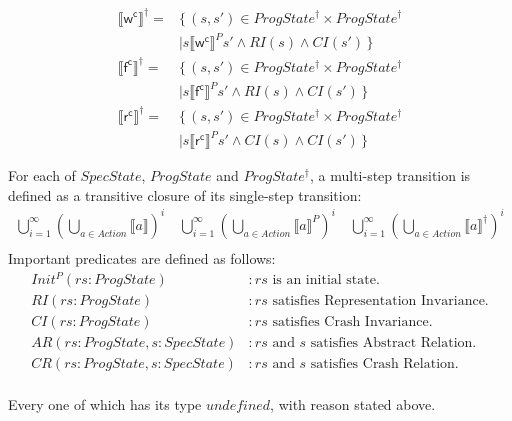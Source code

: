 \documentclass[a4paper,11pt]{article}
\theoremstyle{definition}
\begin{document}
\begin{align*}
	\llbracket \mathsf {w^c} \rrbracket^\dagger ={}& \{\, (s, s') \in ProgState^\dagger \times ProgState^\dagger\\ &\mid s \llbracket \mathsf {w^c} \rrbracket^P s' \land \mathit{RI(s)} \land \mathit{CI(s')} \,\} \\
	\llbracket \mathsf {f^c} \rrbracket^\dagger ={}& \{\, (s, s') \in ProgState^\dagger \times ProgState^\dagger\\ &\mid s \llbracket \mathsf {f^c} \rrbracket^P s' \land \mathit{RI(s)} \land \mathit{CI(s')} \,\} \\
	\llbracket \mathsf {r^c} \rrbracket^\dagger ={}& \{\, (s, s') \in ProgState^\dagger \times ProgState^\dagger\\ &\mid s \llbracket \mathsf {r^c} \rrbracket^P s' \land \mathit{CI(s)} \land \mathit{CI(s')} \,\} 
\end{align*}

For each of $\mathit{SpecState}$, $\mathit{ProgState}$ and $\mathit{ProgState^\dagger}$, a multi-step transition is defined as a transitive closure of its single-step transition:
\begin{align*}
	\bigcup_{i=1}^\infty\left(\bigcup_{a \in Action} \llbracket a \rrbracket \right)^i \quad
	\bigcup_{i=1}^\infty\left(\bigcup_{a \in Action} \llbracket a \rrbracket^P \right)^i \quad
	\bigcup_{i=1}^\infty\left(\bigcup_{a \in Action} \llbracket a \rrbracket^\dagger \right)^i \\
\end{align*}
Important predicates are defined as follows:
\begin{align*}
	\mathit{Init^P(rs : ProgState)} &: \text{$\mathit{rs}$ is an initial state.}\\
	\mathit{RI(rs : ProgState)} &: \text{$\mathit{rs}$ satisfies Representation Invariance.} \\
	\mathit{CI(rs : ProgState)} &: \text{$\mathit{rs}$ satisfies Crash Invariance.} \\
	\mathit{AR(rs : ProgState, s : SpecState)} &: \text{$\mathit{rs}$ and $s$ satisfies Abstract Relation.} \\
	\mathit{CR(rs : ProgState, s : SpecState)} &: \text{$\mathit{rs}$ and $s$ satisfies Crash Relation.} \\
\end{align*}

Every one of which has its type $\mathit{undefined}$, with reason stated above. 
\end{document}
